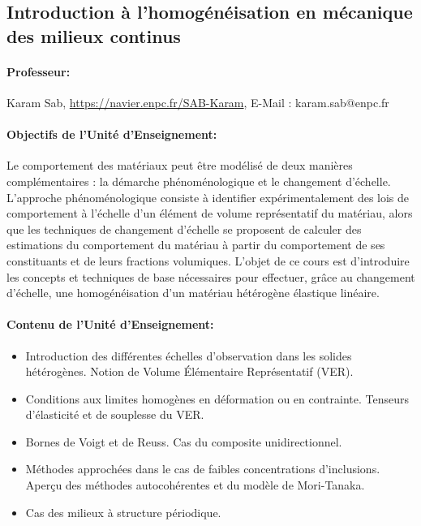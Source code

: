 \subsection{Introduction à l’homogénéisation en mécanique des milieux continus }

\paragraph{Professeur:\newline} 
Karam Sab, \url{https://navier.enpc.fr/SAB-Karam}, E-Mail : 
karam.sab@enpc.fr



\paragraph{Objectifs de l'Unité d'Enseignement: }
Le comportement des matériaux peut être modélisé de deux manières complémentaires : la démarche phénoménologique et le changement d'échelle. L'approche phénoménologique consiste à identifier expérimentalement des lois de comportement à l'échelle d'un élément de volume représentatif du matériau, alors que les techniques de changement d'échelle se proposent de calculer des estimations du comportement du matériau à partir du comportement de ses constituants et de leurs fractions volumiques. L'objet de ce cours est d'introduire les concepts et techniques de base nécessaires pour effectuer, grâce au changement d’échelle, une homogénéisation d’un matériau hétérogène élastique linéaire.

\paragraph{Contenu de l’Unité d’Enseignement:}

\begin{itemize}
	\item Introduction des différentes échelles d'observation dans les solides hétérogènes. Notion de Volume Élémentaire Représentatif (VER).
	\item Conditions aux limites homogènes en déformation ou en contrainte. Tenseurs d'élasticité et de souplesse du VER.
	\item Bornes de Voigt et de Reuss. Cas du composite unidirectionnel.
	\item Méthodes approchées dans le cas de faibles concentrations d'inclusions. Aperçu des méthodes autocohérentes et du modèle de Mori-Tanaka.
	\item Cas des milieux à structure périodique.
\end{itemize}

